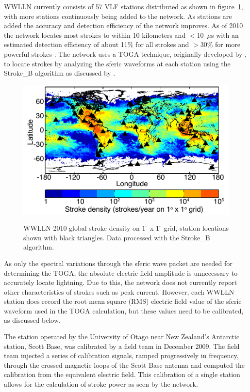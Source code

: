 WWLLN currently consists of 57 VLF stations distributed as shown in figure~\ref{energy:fig:wwlln_dist}, with more stations continuously being added to the network.
As stations are added the accuracy and detection efficiency of the network improves. As of 2010 the network locates most strokes to within 10 kilometers and $<$10~$\mu$s with an estimated detection efficiency of about 11\% for all strokes and $>$30\% for more powerful strokes \citep{Abarca2010,Rodger2009}.
The network uses a TOGA technique, originally developed by \citet{Dowden2000}, to locate strokes by analyzing the sferic waveforms at each station using the Stroke\_B algorithm as discussed by \citet{Rodger2006,Rodger2009}.

\begin{figure}[ht!]
\centering
\includegraphics[scale=2]{energy/Figures/PPS_WWLLN_2010.pdf}\\
\caption{WWLLN 2010 global stroke density on $1^\circ$ x $1^\circ$ grid, station locations shown with black triangles. Data processed with the Stroke\_B algorithm.}
\label{energy:fig:wwlln_dist}
\end{figure}

As only the spectral variations through the sferic wave packet are needed for determining the TOGA, the absolute electric field amplitude is unnecessary to accurately locate lightning. Due to this, the network does not currently report other characteristics of strokes such as peak current.
However, each WWLLN station does record the root mean square (RMS) electric field value of the sferic waveform used in the TOGA calculation, but these values need to be calibrated, as discussed below.

The station operated by the University of Otago near New Zealand's Antarctic station, Scott Base, was calibrated by a field team in December 2009.
The field team injected a series of calibration signals, ramped progressively in frequency, through the crossed magnetic loops of the Scott Base antenna and computed the calibration from the equivalent electric field.
This calibration of a single station allows for the calculation of stroke power as seen by the network.

